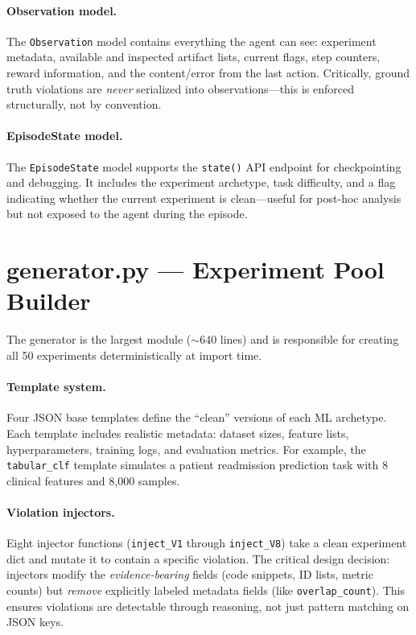 \documentclass{article}
\begin{document}
\paragraph{Observation model.}
The \texttt{Observation} model contains everything the agent can see:
experiment metadata, available and inspected artifact lists, current flags,
step counters, reward information, and the content/error from the last
action.  Critically, ground truth violations are \emph{never} serialized
into observations---this is enforced structurally, not by convention.

\paragraph{EpisodeState model.}
The \texttt{EpisodeState} model supports the \texttt{state()} API endpoint
for checkpointing and debugging.  It includes the experiment archetype,
task difficulty, and a flag indicating whether the current experiment is
clean---useful for post-hoc analysis but not exposed to the agent during
the episode.

\section{generator.py --- Experiment Pool Builder}

The generator is the largest module ($\sim$640 lines) and is responsible
for creating all 50 experiments deterministically at import time.

\paragraph{Template system.}
Four JSON base templates define the ``clean'' versions of each ML
archetype.  Each template includes realistic metadata: dataset sizes,
feature lists, hyperparameters, training logs, and evaluation metrics.
For example, the \texttt{tabular\_clf} template simulates a patient
readmission prediction task with 8 clinical features and 8,000 samples.

\paragraph{Violation injectors.}
Eight injector functions (\texttt{inject\_V1} through \texttt{inject\_V8})
take a clean experiment dict and mutate it to contain a specific violation.
The critical design decision: injectors modify the \emph{evidence-bearing}
fields (code snippets, ID lists, metric counts) but \emph{remove}
explicitly labeled metadata fields (like \texttt{overlap\_count}).  This
ensures violations are detectable through reasoning, not just pattern
matching on JSON keys.
\end{document}
